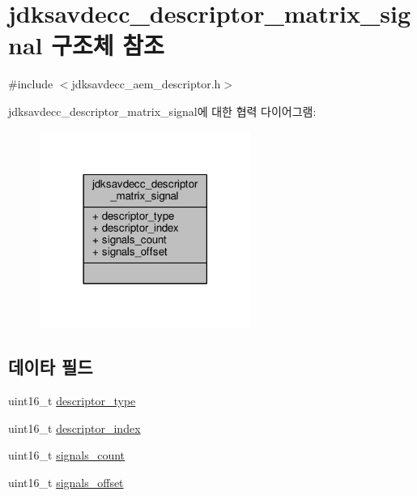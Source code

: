 \hypertarget{structjdksavdecc__descriptor__matrix__signal}{}\section{jdksavdecc\+\_\+descriptor\+\_\+matrix\+\_\+signal 구조체 참조}
\label{structjdksavdecc__descriptor__matrix__signal}


{\ttfamily \#include $<$jdksavdecc\+\_\+aem\+\_\+descriptor.\+h$>$}



jdksavdecc\+\_\+descriptor\+\_\+matrix\+\_\+signal에 대한 협력 다이어그램\+:
\nopagebreak
\begin{figure}[H]
\begin{center}
\leavevmode
\includegraphics[width=194pt]{structjdksavdecc__descriptor__matrix__signal__coll__graph}
\end{center}
\end{figure}
\subsection*{데이타 필드}
\begin{DoxyCompactItemize}
\item 
uint16\+\_\+t \hyperlink{structjdksavdecc__descriptor__matrix__signal_ab7c32b6c7131c13d4ea3b7ee2f09b78d}{descriptor\+\_\+type}
\item 
uint16\+\_\+t \hyperlink{structjdksavdecc__descriptor__matrix__signal_a042bbc76d835b82d27c1932431ee38d4}{descriptor\+\_\+index}
\item 
uint16\+\_\+t \hyperlink{structjdksavdecc__descriptor__matrix__signal_aa06daacf08fd67693f794aedf330942b}{signals\+\_\+count}
\item 
uint16\+\_\+t \hyperlink{structjdksavdecc__descriptor__matrix__signal_a7b876bd908f8076038ffd84de9845183}{signals\+\_\+offset}
\end{DoxyCompactItemize}


